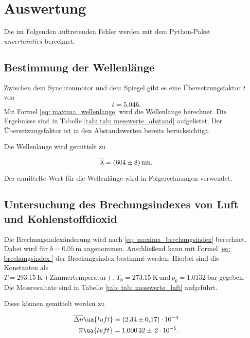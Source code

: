 \section{Auswertung}

Die im Folgenden auftretenden Fehler werden mit dem
Python-Paket \emph{uncertainties}\cite{uncertainties} berechnet.

\subsection{Bestimmung der Wellenlänge}
Zwischen dem Synchronmotor und dem Spiegel gibt es eine Übersetzungsfaktor $t$ von
\begin{equation*}
  t=5.046. %
\end{equation*}
Mit Formel \eqref{eq: maxima_wellenlänge} wird die Wellenlänge berechnet.
Die Ergebnisse sind in Tabelle \ref{tab: tab: messwerte_abstand} aufgelistet.
Der Übersetzungsfaktor ist in den Abstandswerten bereits berücksichtigt.



Die Wellenlänge wird gemittelt zu

\begin{equation}
  \label{eq:wellenlaenge}
  \overline{\lambda}=\SI{604\pm 8}{\nano\meter}.
\end{equation}

Der ermittelte Wert für die Wellenlänge wird in Folgerechnungen verwendet.

\subsection{Untersuchung des Brechungsindexes von Luft und Kohlenstoffdioxid}

Die Brechungsindexänderung wird nach \eqref{eq: maxima_brechungsindex} berechnet. Dabei wird
für $b=\SI{0.05}{\meter}$ angenommen. Anschließend kann mit Formel \eqref{eq: brechungsindex
} der Brechungsindex bestimmt werden. Hierbei sind die Konstanten als $T=\SI{293.15}{\kelvin}\, \left(\text{Zimmertemperatur}\right),\, T_0=\SI{273.15}{\kelvin} \, %
\text{und} \, p_0=\SI{1.0132}{\bar}$ gegeben.\cite{anleitung401}
Die Messresultate sind in Tabelle \ref{tab: tab: messwerte_luft} aufgeführt.

Diese können gemittelt werden zu

\begin{align}
  \label{eq:mittelwerte_luft}
  \begin{aligned}
    \overline{\Delta n}\ua{luft}=\num{2.34\pm 0.17 e-4}\\
    \overline{n}\ua{luft}=\num{1.00032}\pm\, \num{2e-5}.
  \end{aligned}
\end{align}

